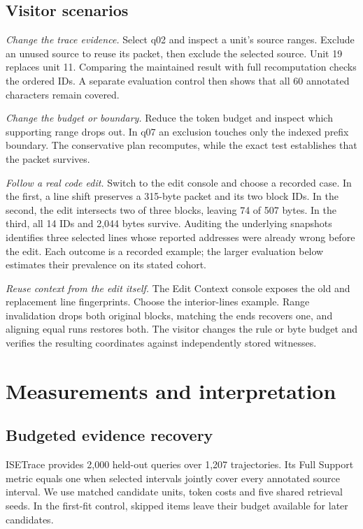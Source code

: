 \documentclass[conference]{IEEEtran}
\begin{document}
\subsection{Visitor scenarios}
\textit{Change the trace evidence.} Select q02 and inspect a unit's source ranges. Exclude an unused source to reuse its packet, then exclude the selected source. Unit 19 replaces unit 11. Comparing the maintained result with full recomputation checks the ordered IDs. A separate evaluation control then shows that all 60 annotated characters remain covered.

\textit{Change the budget or boundary.} Reduce the token budget and inspect which supporting range drops out. In q07 an exclusion touches only the indexed prefix boundary. The conservative plan recomputes, while the exact test establishes that the packet survives.

\textit{Follow a real code edit.} Switch to the edit console and choose a recorded case. In the first, a line shift preserves a 315-byte packet and its two block IDs. In the second, the edit intersects two of three blocks, leaving 74 of 507 bytes. In the third, all 14 IDs and 2,044 bytes survive. Auditing the underlying snapshots identifies three selected lines whose reported addresses were already wrong before the edit. Each outcome is a recorded example; the larger evaluation below estimates their prevalence on its stated cohort.

\textit{Reuse context from the edit itself.} The Edit Context console exposes the old and replacement line fingerprints. Choose the interior-lines example. Range invalidation drops both original blocks, matching the ends recovers one, and aligning equal runs restores both. The visitor changes the rule or byte budget and verifies the resulting coordinates against independently stored witnesses.

\section{Measurements and interpretation}
\subsection{Budgeted evidence recovery}
ISETrace provides 2,000 held-out queries over 1,207 trajectories. Its Full Support metric equals one when selected intervals jointly cover every annotated source interval. We use matched candidate units, token costs and five shared retrieval seeds. In the first-fit control, skipped items leave their budget available for later candidates.
\end{document}
